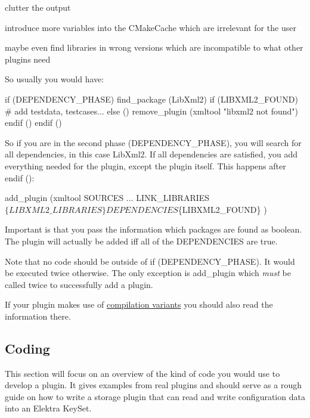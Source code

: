 \begin{DoxyItemize}
\item clutter the output
\item introduce more variables into the {\ttfamily C\+Make\+Cache} which are irrelevant for the user
\item maybe even find libraries in wrong versions which are incompatible to what other plugins need
\end{DoxyItemize}

So usually you would have\+:


\begin{DoxyCode}
if (DEPENDENCY\_PHASE)
        find\_package (LibXml2)
        if (LIBXML2\_FOUND)
                # add testdata, testcases...
        else ()
                remove\_plugin (xmltool "libxml2 not found")
        endif ()
endif ()
\end{DoxyCode}


So if you are in the second phase ({\ttfamily D\+E\+P\+E\+N\+D\+E\+N\+C\+Y\+\_\+\+P\+H\+A\+SE}), you will search for all dependencies, in this case {\ttfamily Lib\+Xml2}. If all dependencies are satisfied, you add everything needed for the plugin, except the plugin itself. This happens after {\ttfamily endif ()}\+:


\begin{DoxyCode}
add\_plugin (xmltool
        SOURCES
                ...
        LINK\_LIBRARIES
                $\{LIBXML2\_LIBRARIES\}
        DEPENDENCIES
                $\{LIBXML2\_FOUND\}
        )
\end{DoxyCode}


Important is that you pass the information which packages are found as boolean. The plugin will actually be added iff all of the {\ttfamily D\+E\+P\+E\+N\+D\+E\+N\+C\+I\+ES} are true.

Note that no code should be outside of {\ttfamily if (D\+E\+P\+E\+N\+D\+E\+N\+C\+Y\+\_\+\+P\+H\+A\+SE)}. It would be executed twice otherwise. The only exception is {\ttfamily add\+\_\+plugin} which {\itshape must} be called twice to successfully add a plugin.

If your plugin makes use of \hyperlink{doc_tutorials_compilation-variants_md}{compilation variants} you should also read the information there.

\subsection*{Coding}

This section will focus on an overview of the kind of code you would use to develop a plugin. It gives examples from real plugins and should serve as a rough guide on how to write a storage plugin that can read and write configuration data into an Elektra {\ttfamily Key\+Set}.

